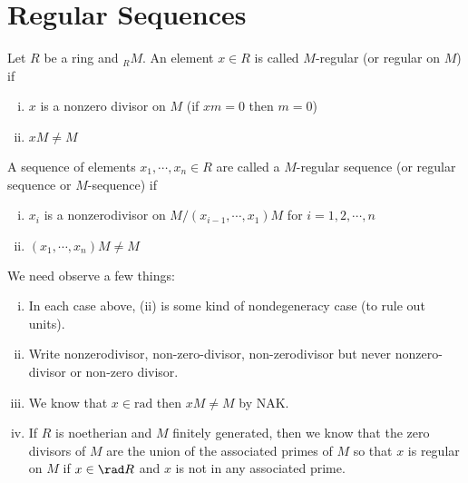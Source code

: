 
\newpage

\section{Regular Sequences}

\begin{dfn}[$M$-regular]
Let $R$ be a ring and $_R M$. An element $x \in R$ is called $M$-regular (or regular on $M$) if 
\begin{enumerate}[(i)]
\item $x$ is a nonzero divisor on $M$ (if $xm=0$ then $m=0$) 
\item $xM \neq M$
\end{enumerate}
\end{dfn}

\begin{dfn}[$M$-sequences]
A sequence of elements $x_1,\cdots,x_n \in R$ are called a $M$-regular sequence (or regular sequence or $M$-sequence) if
\begin{enumerate}[(i)]
\item $x_i$ is a nonzerodivisor on $M/(x_{i-1},\cdots,x_1)M$ for $i=1,2,\cdots,n$
\item $(x_1,\cdots,x_n)M \neq M$
\end{enumerate}
\end{dfn}

\begin{rem} 
We need observe a few things:
\begin{enumerate}[(i)]
\item In each case above, (ii) is some kind of nondegeneracy case (to rule out units). 
\item Write nonzerodivisor, non-zero-divisor, non-zerodivisor but never nonzero-divisor or non-zero divisor. 
\item We know that $x \in \text{rad}$ then $xM \neq M$ by NAK. 
\item If $R$ is noetherian and $M$ finitely generated, then we know that the zero divisors of $M$ are the union of the associated primes of $M$ so that $x$ is regular on $M$ if $x \in \rad R$ and $x$ is not in any associated prime. 
\end{enumerate}
\end{rem}

